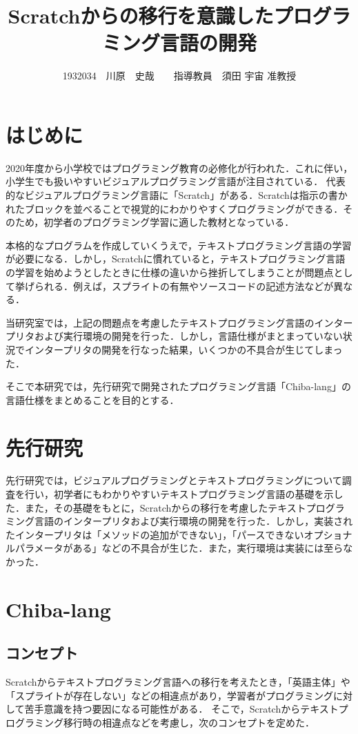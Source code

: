 \documentclass[twocolumn,10pt,a4j]{ltjsarticle}
\title{Scratchからの移行を意識したプログラミング言語の開発}
\author{1932034　川原　史哉　　指導教員　須田 宇宙 准教授}
\date{}
\begin{document}
\maketitle

\section{はじめに}
2020年度から小学校ではプログラミング教育の必修化が行われた．これに伴い，小学生でも扱いやすいビジュアルプログラミング言語が注目されている．
代表的なビジュアルプログラミング言語に「Scratch」がある．Scratchは指示の書かれたブロックを並べることで視覚的にわかりやすくプログラミングができる．そのため，初学者のプログラミング学習に適した教材となっている．

本格的なプログラムを作成していくうえで，テキストプログラミング言語の学習が必要になる．しかし，Scratchに慣れていると，テキストプログラミング言語の学習を始めようとしたときに仕様の違いから挫折してしまうことが問題点として挙げられる．例えば，スプライトの有無やソースコードの記述方法などが異なる．

当研究室では，上記の問題点を考慮したテキストプログラミング言語のインタープリタおよび実行環境の開発を行った．しかし，言語仕様がまとまっていない状況でインタープリタの開発を行なった結果，いくつかの不具合が生じてしまった\cite{senkou1}\cite{senkou2}．

そこで本研究では，先行研究で開発されたプログラミング言語「Chiba-lang」の言語仕様をまとめることを目的とする．

\section{先行研究}
先行研究では，ビジュアルプログラミングとテキストプログラミングについて調査を行い，初学者にもわかりやすいテキストプログラミング言語の基礎を示した\cite{senkou1}．また，その基礎をもとに，Scratchからの移行を考慮したテキストプログラミング言語のインタープリタおよび実行環境の開発を行った．しかし，実装されたインタープリタは「メソッドの追加ができない」，「パースできないオプショナルパラメータがある」などの不具合が生じた．また，実行環境は実装には至らなかった\cite{senkou2}．

\section{Chiba-lang}
\subsection{コンセプト}
Scratchからテキストプログラミング言語への移行を考えたとき，「英語主体」や「スプライトが存在しない」などの相違点があり，学習者がプログラミングに対して苦手意識を持つ要因になる可能性がある．
そこで，Scratchからテキストプログラミング移行時の相違点などを考慮し，次のコンセプトを定めた．
\end{document}
